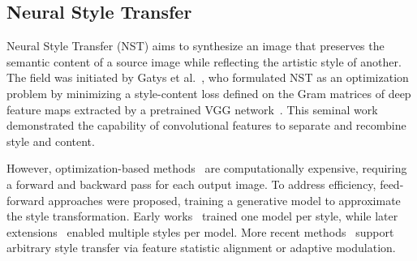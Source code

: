 \documentclass[letterpaper]{article} %
\begin{document}





\subsection{Neural Style Transfer}

Neural Style Transfer (NST) aims to synthesize an image that preserves the semantic content of a source image while reflecting the artistic style of another. The field was initiated by Gatys et al.~\cite{gatys2016image}, who formulated NST as an optimization problem by minimizing a style-content loss defined on the Gram matrices of deep feature maps extracted by a pretrained VGG network~\cite{25simonyan2014very}. This seminal work demonstrated the capability of convolutional features to separate and recombine style and content.

However, optimization-based methods~\cite{li2016combining, berger2016incorporating, risser2017stable} are computationally expensive, requiring a forward and backward pass for each output image. To address efficiency, feed-forward approaches were proposed, training a generative model to approximate the style transformation. Early works~\cite{johnson2016perceptual, ulyanov2016texture} trained one model per style, while later extensions~\cite{dumoulin2016learned, chen2017stylebank} enabled multiple styles per model. More recent methods~\cite{huang2017arbitrary, xu2021drb, kwon2024aesfa} support arbitrary style transfer via feature statistic alignment or adaptive modulation.
\end{document}
